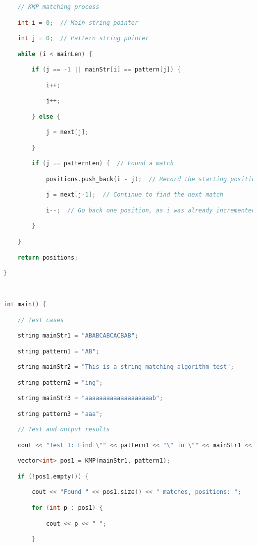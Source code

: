 \begin{lstlisting}[language=C++]
    // KMP matching process

    int i = 0;  // Main string pointer

    int j = 0;  // Pattern string pointer

    while (i < mainLen) {

        if (j == -1 || mainStr[i] == pattern[j]) {

            i++;

            j++;

        } else {

            j = next[j];

        }

        if (j == patternLen) {  // Found a match

            positions.push_back(i - j);  // Record the starting position of the match

            j = next[j-1];  // Continue to find the next match

            i--;  // Go back one position, as i was already incremented

        }

    }

    return positions;

}

  

int main() {

    // Test cases

    string mainStr1 = "ABABCABCACBAB";

    string pattern1 = "AB";

    string mainStr2 = "This is a string matching algorithm test";

    string pattern2 = "ing";

    string mainStr3 = "aaaaaaaaaaaaaaaaaaab";

    string pattern3 = "aaa";

    // Test and output results

    cout << "Test 1: Find \"" << pattern1 << "\" in \"" << mainStr1 << "\"" << endl;

    vector<int> pos1 = KMP(mainStr1, pattern1);

    if (!pos1.empty()) {

        cout << "Found " << pos1.size() << " matches, positions: ";

        for (int p : pos1) {

            cout << p << " ";

        }


\end{lstlisting}
